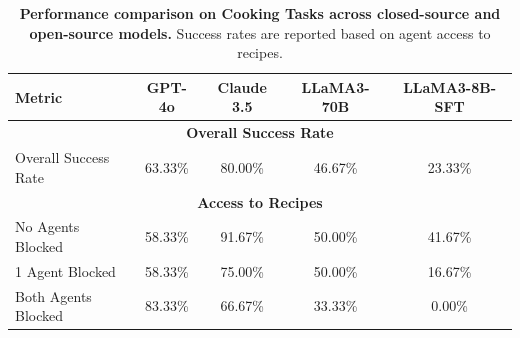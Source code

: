 \begin{table}
\centering
\small
\setlength{\tabcolsep}{4pt} %
\renewcommand{\arraystretch}{1.2} %
\begin{tabular}{lcccc}
\toprule
\textbf{Metric} & \textbf{GPT-4o}  & \textbf{Claude 3.5} & \textbf{LLaMA3-70B} & \textbf{LLaMA3-8B-SFT} \\
\midrule
\multicolumn{5}{c}{\textbf{Overall Success Rate}} \\
\midrule
Overall Success Rate  & 63.33\%  & 80.00\%  & 46.67\%  & 23.33\%  \\
\midrule
\multicolumn{5}{c}{\textbf{Access to Recipes}} \\
\midrule
No Agents Blocked              & 58.33\%   & 91.67\%  & 50.00\%  & 41.67\%  \\
1 Agent Blocked                & 58.33\%   & 75.00\%  & 50.00\%  & 16.67\%  \\
Both Agents Blocked            & 83.33\%   & 66.67\%  & 33.33\%  & 0.00\%  \\
\bottomrule
\end{tabular}
\caption{\textbf{Performance comparison on Cooking Tasks across closed-source and open-source models.} Success rates are reported based on agent access to recipes.}
\label{tab:model-success-rates}
\end{table}





